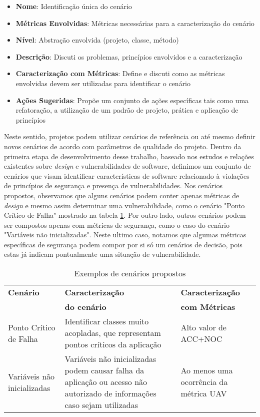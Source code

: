 \begin{itemize}
\item \textbf{Nome}: Identificação única do cenário
\item \textbf{Métricas Envolvidas}: Métricas necessárias para a caracterização do cenário
\item \textbf{Nível}: Abstração envolvida (projeto, classe, método)
\item \textbf{Descrição}: Discuti os problemas, princípios envolvidos e a caracterização
\item \textbf{Caracterização com Métricas}: Define e discuti como as métricas envolvidas devem ser utilizadas para identificar o cenário
\item \textbf{Ações Sugeridas}: Propõe um conjunto de ações específicas tais como uma refatoração, a utilização de um padrão de projeto, prática e aplicação de princípios
\end{itemize}


Neste sentido, projetos podem utilizar cenários de referência ou até mesmo definir novos cenários de acordo com parâmetros de qualidade do projeto. Dentro da primeira etapa de desenvolvimento desse trabalho, baseado nos estudos e relações existentes sobre \emph{design} e vulnerabilidades de software, definimos um conjunto de cenários que visam identificar características de software relacionado à violações de princípios de segurança e presença de vulnerabilidades. Nos cenários propostos, observamos que alguns cenários podem conter apenas métricas de \emph{design} e mesmo assim determinar uma vulnerabilidade, como o cenário "Ponto Crítico de Falha" mostrado na tabela \ref{tab:resumo2}. Por outro lado, outros cenários podem ser compostos apenas com métricas de segurança, como o caso do cenário "Variáveis não inicializadas". Neste ultimo caso, notamos que algumas métricas específicas de segurança podem compor por si só um cenários de decisão, pois estas já indicam pontualmente uma situação de vulnerabilidade.

	\begin{table}[h!]
		\begin{center}
	    \begin{tabular}{ |p{2cm}| p{3cm} | p{2cm} |}
	    \hline
	    \textbf{Cenário} & \textbf{Caracterização} & \textbf{Caracterização} \\
	      & \textbf{do cenário}  & \textbf{com Métricas}  \\ 	\hline
	    
	    Ponto Crítico de Falha & Identificar classes muito acopladas, que representam pontos críticos da aplicação & Alto valor de ACC+NOC \\
	 \hline
	    Variáveis não inicializadas  & Variáveis não inicializadas podem causar falha da aplicação ou acesso não autorizado de informações caso sejam utilizadas & Ao menos uma ocorrência da métrica UAV  \\ \hline

	    \end{tabular}
		    \caption{Exemplos de cenários propostos}
		    \label{tab:resumo2}
		\end{center}
	\end{table}

